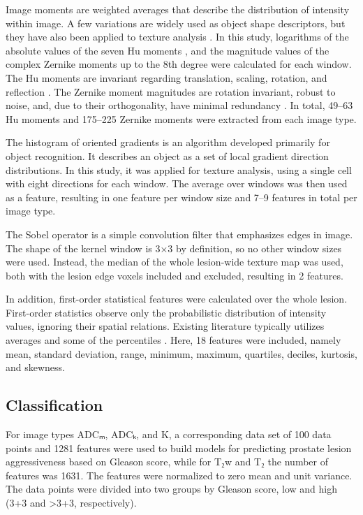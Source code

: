 Image moments are weighted averages that describe the distribution of intensity
within image. A few variations are widely used as object shape descriptors, but
they have also been applied to texture analysis \citep{Tuceryan1994}. In this
study, logarithms of the absolute values of the seven Hu moments \citep{Hu1962},
and the magnitude values of the complex Zernike moments \citep{Teague1980} up to
the 8th degree were calculated for each window. The Hu moments are invariant
regarding translation, scaling, rotation, and reflection
\citep{Theodoridis2003}. The Zernike moment magnitudes are rotation invariant,
robust to noise, and, due to their orthogonality, have minimal redundancy
\citep{Tahmasbi2011, Amayeh2005}. In total, 49--63 Hu moments and 175--225
Zernike moments were extracted from each image type.

The histogram of oriented gradients \citep{Dalal2005} is an algorithm developed
primarily for object recognition. It describes an object as a set of local
gradient direction distributions. In this study, it was applied for texture
analysis, using a single cell with eight directions for each window. The average
over windows was then used as a feature, resulting in one feature per window
size and 7--9 features in total per image type.

The Sobel operator \citep{Sobel1990} is a simple convolution filter that
emphasizes edges in image. The shape of the kernel window is 3×3 by definition,
so no other window sizes were used. Instead, the median of the whole lesion-wide
texture map was used, both with the lesion edge voxels included and excluded,
resulting in 2 features.

In addition, first-order statistical features were calculated over the whole
lesion. First-order statistics observe only the probabilistic distribution of
intensity values, ignoring their spatial relations. Existing literature
typically utilizes averages and some of the percentiles \citep{Shaish2016}.
Here, 18 features were included, namely mean, standard deviation, range,
minimum, maximum, quartiles, deciles, kurtosis, and skewness.


\subsection{Classification}

For image types ADCₘ, ADCₖ, and K, a corresponding data set of 100 data points and
1281 features were used to build models for predicting prostate lesion
aggressiveness based on Gleason score, while for T₂w and T₂ the number of
features was 1631. The features were normalized to zero mean and unit variance.
The data points were divided into two groups by Gleason score, low and high
(3+3 and >3+3, respectively).

